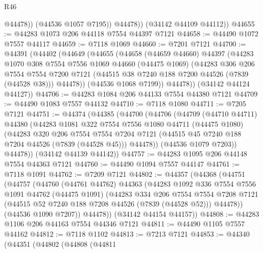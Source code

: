 \begin{lexlean}{R46}
\begin{coremodule}
                @44478))
            (@44536 @1057 @7195))
          @44478))
      (@34142 @44109 @44112))
@44655 := @44283 @1073 @206 @44118 @7554 @44397 @7121
@44658 := @44490 @1072 @7557 @44117
@44659 := @7118 @1069
@44660 := @7201 @7121
@44700 := @44391
    (@44402
      (@44649
        (@44655
          (@44658
            (@44659 @44660)
            @44397
            (@44283
              @1070
              @308
              @7554
              @7556
              @1069
              @44660
              (@44475 @1069)
              (@44283
                @306
                @206
                @7554
                @7554
                @7200
                @7121
                (@44515 @38 @7240 @188 @7200 @44526 (@7839 (@44528 @38)))
                @44478))
            (@44536 @1068 @7199))
          @44478))
      (@34142 @44124 @44127))
@44706 := @44283 @1084 @206 @44133 @7554 @44380 @7121
@44709 := @44490 @1083 @7557 @44132
@44710 := @7118 @1080
@44711 := @7205 @7121
@44751 := @44374
    (@44385
      (@44700
        (@44706
          (@44709
            (@44710 @44711)
            @44380
            (@44283
              @1081
              @322
              @7554
              @7556
              @1080
              @44711
              (@44475 @1080)
              (@44283
                @320
                @206
                @7554
                @7554
                @7204
                @7121
                (@44515 @45 @7240 @188 @7204 @44526 (@7839 (@44528 @45)))
                @44478))
            (@44536 @1079 @7203))
          @44478))
      (@34142 @44139 @44142))
@44757 := @44283 @1095 @206 @44148 @7554 @44363 @7121
@44760 := @44490 @1094 @7557 @44147
@44761 := @7118 @1091
@44762 := @7209 @7121
@44802 := @44357
    (@44368
      (@44751
        (@44757
          (@44760
            (@44761 @44762)
            @44363
            (@44283
              @1092
              @336
              @7554
              @7556
              @1091
              @44762
              (@44475 @1091)
              (@44283
                @334
                @206
                @7554
                @7554
                @7208
                @7121
                (@44515 @52 @7240 @188 @7208 @44526 (@7839 (@44528 @52)))
                @44478))
            (@44536 @1090 @7207))
          @44478))
      (@34142 @44154 @44157))
@44808 := @44283 @1106 @206 @44163 @7554 @44346 @7121
@44811 := @44490 @1105 @7557 @44162
@44812 := @7118 @1102
@44813 := @7213 @7121
@44853 := @44340
    (@44351
      (@44802
        (@44808
          (@44811

\end{coremodule}
\end{lexlean}
